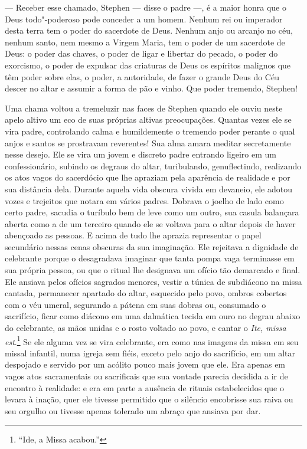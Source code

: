  --- Receber esse chamado, Stephen --- disse o padre ---, é a maior honra que o
 Deus todo"-poderoso pode conceder a um homem. Nenhum rei ou imperador
desta terra tem o poder do sacerdote de Deus. Nenhum anjo ou arcanjo no
céu, nenhum santo, nem mesmo a Virgem Maria, tem o poder de um
sacerdote de Deus: o poder das chaves, o poder de ligar e libertar do
pecado, o poder do exorcismo, o poder de expulsar das criaturas de Deus
os espíritos malignos que têm poder sobre elas, o poder, a autoridade,
de fazer o grande Deus do Céu descer no altar e assumir a forma de pão
e vinho. Que poder tremendo, Stephen!

Uma chama voltou a tremeluzir nas faces de Stephen quando ele ouviu
neste apelo altivo um eco de suas próprias altivas preocupações.
Quantas vezes ele se vira padre, controlando calma e humildemente o
tremendo poder perante o qual anjos e santos se prostravam reverentes!
Sua alma amara meditar secretamente nesse desejo. Ele se vira um jovem
e discreto padre entrando ligeiro em um confessionário, subindo os
degraus do altar, turibulando, genuflectindo, realizando os atos vagos
do sacerdócio que lhe apraziam pela aparência de realidade e por sua distância
dela. Durante aquela vida obscura vivida em devaneio, ele adotou vozes
e trejeitos que notara em vários padres. Dobrava o joelho de lado como
certo padre, sacudia o turíbulo bem de leve como um outro, sua casula
balançara aberta como a de um terceiro quando ele se voltava para o
altar depois de haver abençoado as pessoas. E acima de tudo lhe aprazia
representar o papel secundário nessas cenas obscuras da sua imaginação.
Ele rejeitava a dignidade de celebrante porque o desagradava imaginar
que tanta pompa vaga terminasse em sua própria pessoa, ou que o ritual
lhe designava um ofício tão demarcado e final. Ele ansiava pelos
ofícios sagrados menores, vestir a túnica de subdiácono na missa
cantada, permanecer apartado do altar, esquecido pelo povo, ombros
cobertos com o véu umeral, segurando a pátena em suas dobras ou,
consumado o sacrifício, ficar como diácono em uma dalmática tecida em
ouro no degrau abaixo do celebrante, as mãos unidas e o rosto voltado
ao povo, e cantar o \textit{Ite, missa est}.\footnote{ “Ide, a
Missa acabou.”} Se ele alguma vez se vira celebrante, era como nas
imagens da missa em seu missal infantil, numa igreja sem fiéis, exceto
pelo anjo do sacrifício, em um altar despojado e servido por um acólito
pouco mais jovem que ele. Era apenas em vagos atos sacramentais ou
sacrificais que sua vontade parecia decidida a ir de encontro à
realidade: e era em parte a ausência de rituais estabelecidos que o
levara à inação, quer ele tivesse permitido que o silêncio encobrisse
sua raiva ou seu orgulho ou tivesse apenas tolerado um abraço que  ansiava
por dar.

